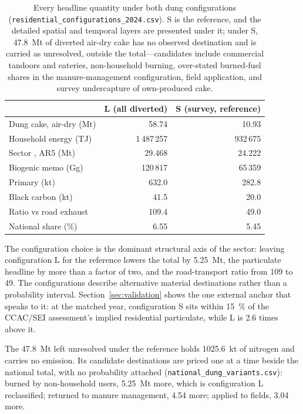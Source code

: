 \begin{table}[htbp]
\centering
\footnotesize
\begin{tabular}{@{}lrr@{}}
\toprule
 & \textbf{L (all diverted)} & \textbf{S (survey, reference)} \\
\midrule
Dung cake, air-dry (Mt)        & 58.74 & 10.93 \\
Household energy (TJ)          & 1\,487\,257 & 932\,675 \\
Sector \COe{}, AR5 (Mt)        & 29.468 & 24.222 \\
Biogenic memo \COtwo{} (Gg)    & 120\,817 & 65\,359 \\
Primary \PM{} (kt)             & 632.0 & 282.8 \\
Black carbon (kt)              & 41.5  & 20.0 \\
Ratio vs road exhaust \PM{}    & 109.4 & 49.0 \\
National share (\%)            & 6.55  & 5.45 \\
\bottomrule
\end{tabular}
\caption{Every headline quantity under both dung configurations
(\texttt{residential\_configurations\_2024.csv}). S is the reference, and the
detailed spatial and temporal layers are presented under it;
under S, \SI{47.8}{\mega\tonne} of diverted air-dry cake has no observed
destination and is carried as unresolved, outside the total---candidates include
commercial tandoors and eateries, non-household
burning, over-stated burned-fuel shares in the manure-management configuration, field
application, and
survey undercapture of own-produced cake.}
\label{tab:configs}
\end{table}

The configuration choice is the dominant structural axis of the sector: leaving
configuration L for the reference lowers the
total by \SI{5.25}{\mega\tonne}, the particulate headline by more than a factor of two,
and the road-transport ratio from \num{109} to \num{49}. The configurations describe alternative material destinations rather than
a probability interval. Section~\ref{sec:validation} shows the one
external anchor that speaks to it: at the matched year, configuration S sits within
\SI{15}{\percent} of the CCAC/SEI assessment's implied residential particulate, while L
is \num{2.6} times above it.

The \SI{47.8}{\mega\tonne} left unresolved under the reference holds
\SI{1025.6}{\kilo\tonne} of nitrogen and carries no emission. Its candidate
destinations are priced one at a time beside the national total, with no probability
attached (\texttt{national\_dung\_variants.csv}): burned by non-household users,
\SI{5.25}{\mega\tonne} more, which is configuration L reclassified; returned to manure
management, \SI{4.54}{} more; applied to fields, \SI{3.04}{} more.

